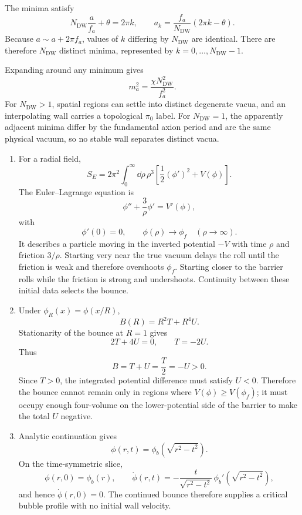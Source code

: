 \begin{enumerate}
  The minima satisfy
  \[
    N_{\mathrm{DW}}\frac a{f_a}+\theta=2\pi k,
    \qquad
    a_k=\frac{f_a}{N_{\mathrm{DW}}}(2\pi k-\theta).
  \]
  Because \(a\sim a+2\pi f_a\), values of \(k\) differing by
  \(N_{\mathrm{DW}}\) are identical.  There are therefore
  \(N_{\mathrm{DW}}\) distinct minima, represented by
  \(k=0,\ldots,N_{\mathrm{DW}}-1\).

  Expanding around any minimum gives
  \[
    \boxed{m_a^2=\frac{\chi N_{\mathrm{DW}}^2}{f_a^2}.}
  \]
  For \(N_{\mathrm{DW}}>1\), spatial regions can settle into distinct
  degenerate vacua, and an interpolating wall carries a topological
  \(\pi_0\) label.  For \(N_{\mathrm{DW}}=1\), the apparently adjacent
  minima differ by the fundamental axion period and are the same
  physical vacuum, so no stable wall separates distinct vacua.

  \begin{enumerate}
    \item[(a)]
    For a radial field,
    \[
      S_E=2\pi^2\int_0^\infty \dd\rho\,\rho^3
        \left[\frac12(\phi')^2+V(\phi)\right].
    \]
    The Euler--Lagrange equation is
    \[
      \boxed{\phi''+\frac3\rho\phi'=V'(\phi),}
    \]
    with
    \[
      \phi'(0)=0,\qquad
      \phi(\rho)\longrightarrow\phi_f
        \quad(\rho\to\infty).
    \]
    It describes a particle moving in the inverted potential \(-V\) with
    time \(\rho\) and friction \(3/\rho\).  Starting very near the true
    vacuum delays the roll until the friction is weak and therefore
    overshoots \(\phi_f\).  Starting closer to the barrier rolls while
    the friction is strong and undershoots.  Continuity between these
    initial data selects the bounce.
    \item[(b)]
    Under \(\phi_R(x)=\phi(x/R)\),
    \[
      B(R)=R^2T+R^4U.
    \]
    Stationarity of the bounce at \(R=1\) gives
    \[
      2T+4U=0,\qquad T=-2U.
    \]
    Thus
    \[
      \boxed{B=T+U=\frac T2=-U>0.}
    \]
    Since \(T>0\), the integrated potential difference must satisfy
    \(U<0\).  Therefore the bounce cannot remain only in regions where
    \(V(\phi)\ge V(\phi_f)\); it must occupy enough four-volume on the
    lower-potential side of the barrier to make the total \(U\) negative.
    \item[(c)]
    Analytic continuation gives
    \[
      \phi(r,t)=\phi_b\left(\sqrt{r^2-t^2}\right).
    \]
    On the time-symmetric slice,
    \[
      \phi(r,0)=\phi_b(r),\qquad
      \dot\phi(r,t)
        =-\frac{t}{\sqrt{r^2-t^2}}\,
         \phi_b'\left(\sqrt{r^2-t^2}\right),
    \]
    and hence \(\dot\phi(r,0)=0\).  The continued bounce therefore
    supplies a critical bubble profile with no initial wall velocity.


\end{enumerate}
\end{enumerate}
